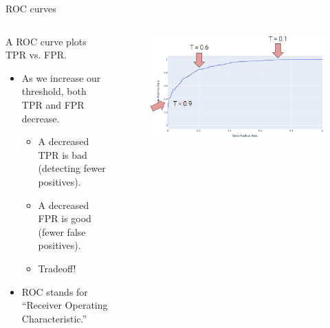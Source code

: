 \documentclass[aspectratio=169]{../latex_main/tntbeamer}  %
\begin{document}
	
	\begin{frame}{ROC curves}
	    \begin{columns}
	        \begin{column}{.5\textwidth}
    	        A ROC curve plots TPR vs. FPR.
	             \begin{itemize}
	                 \item As we increase our threshold, both TPR and FPR decrease.
	                 \begin{itemize}
	                     \item A decreased TPR is bad (detecting fewer positives).
	                     \item A decreased FPR is good (fewer false positives).
	                     \item Tradeoff!
	                 \end{itemize}
	             \end{itemize}
	             \begin{itemize}
	                 \item ROC stands for “Receiver Operating Characteristic.”
	             \end{itemize}
	        \end{column}
	        
	        
	        \begin{column}{.5\textwidth}
	                \begin{figure}
	                    \centering
	                    \includegraphics[scale=.35]{Bild28}
	                \end{figure}
	                
	                
	        \end{column}
	        
	    \end{columns}
	\end{frame}
	
\end{document}
